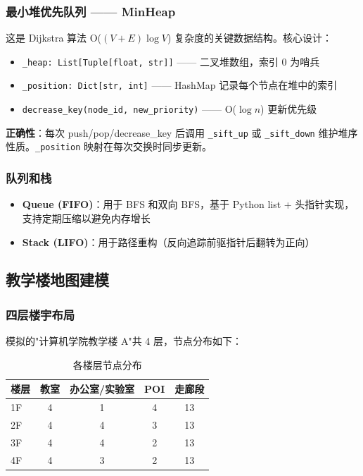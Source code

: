 \documentclass[11pt,a4paper]{ctexart}
\begin{document}
\subsubsection{最小堆优先队列 —— MinHeap}

这是 Dijkstra 算法 O($(V+E)\log V$) 复杂度的关键数据结构。核心设计：

\begin{itemize}
    \item \texttt{\_heap: List[Tuple[float, str]]} —— 二叉堆数组，索引 0 为哨兵
    \item \texttt{\_position: Dict[str, int]} —— HashMap 记录每个节点在堆中的索引
    \item \texttt{decrease\_key(node\_id, new\_priority)} —— O($\log n$) 更新优先级
\end{itemize}

\textbf{正确性}：每次 push/pop/decrease\_key 后调用 \texttt{\_sift\_up} 或
\texttt{\_sift\_down} 维护堆序性质。\texttt{\_position} 映射在每次交换时同步更新。

\subsubsection{队列和栈}

\begin{itemize}
    \item \textbf{Queue (FIFO)}：用于 BFS 和双向 BFS，基于 Python list + 头指针实现，
          支持定期压缩以避免内存增长
    \item \textbf{Stack (LIFO)}：用于路径重构（反向追踪前驱指针后翻转为正向）
\end{itemize}

\subsection{教学楼地图建模}

\subsubsection{四层楼宇布局}

模拟的"计算机学院教学楼 A"共 4 层，节点分布如下：

\begin{table}[htbp]
\centering
\begin{tabular}{@{}lcccc@{}}
\toprule
楼层 & 教室 & 办公室/实验室 & POI & 走廊段 \\
\midrule
1F & 4 & 1 & 4 & 13 \\
2F & 4 & 4 & 3 & 13 \\
3F & 4 & 4 & 2 & 13 \\
4F & 4 & 3 & 2 & 13 \\
\bottomrule
\end{tabular}
\caption{各楼层节点分布}
\end{table}
\end{document}
